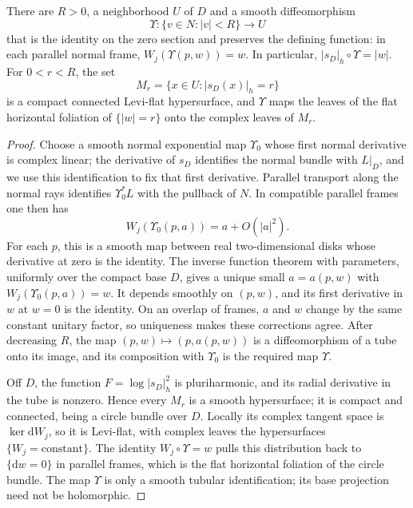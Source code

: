 \begin{lemma}\label{lem:flat-divisor-foliated-tube}
There are $R>0$, a neighborhood $U$ of $D$ and a smooth diffeomorphism
\[
 \Upsilon\colon\{v\in N:|v|<R\}\longrightarrow U
\]
that is the identity on the zero section and preserves the defining function: in each parallel normal frame, $W_j(\Upsilon(p,w))=w$. In particular, $|s_D|_h\circ\Upsilon=|w|$. For $0<r<R$, the set
\[
 M_r=\{x\in U:|s_D(x)|_h=r\}
\]
is a compact connected Levi-flat hypersurface, and $\Upsilon$ maps the leaves of the flat horizontal foliation of $\{|w|=r\}$ onto the complex leaves of $M_r$.
\end{lemma}
\begin{proof}
Choose a smooth normal exponential map $\Upsilon_0$ whose first normal derivative is complex linear; the derivative of $s_D$ identifies the normal bundle with $L|_D$, and we use this identification to fix that first derivative. Parallel transport along the normal rays identifies $\Upsilon_0^*L$ with the pullback of $N$. In compatible parallel frames one then has
\[
 W_j(\Upsilon_0(p,a))=a+O(|a|^2).
\]
For each $p$, this is a smooth map between real two-dimensional disks whose derivative at zero is the identity. The inverse function theorem with parameters, uniformly over the compact base $D$, gives a unique small $a=a(p,w)$ with $W_j(\Upsilon_0(p,a))=w$. It depends smoothly on $(p,w)$, and its first derivative in $w$ at $w=0$ is the identity. On an overlap of frames, $a$ and $w$ change by the same constant unitary factor, so uniqueness makes these corrections agree. After decreasing $R$, the map $(p,w)\mapsto(p,a(p,w))$ is a diffeomorphism of a tube onto its image, and its composition with $\Upsilon_0$ is the required map $\Upsilon$.

Off $D$, the function $F=\log|s_D|_h^2$ is pluriharmonic, and its radial derivative in the tube is nonzero. Hence every $M_r$ is a smooth hypersurface; it is compact and connected, being a circle bundle over $D$. Locally its complex tangent space is $\ker\mathrm dW_j$, so it is Levi-flat, with complex leaves the hypersurfaces $\{W_j=\text{constant}\}$. The identity $W_j\circ\Upsilon=w$ pulls this distribution back to $\{\mathrm dw=0\}$ in parallel frames, which is the flat horizontal foliation of the circle bundle. The map $\Upsilon$ is only a smooth tubular identification; its base projection need not be holomorphic.
\end{proof}

